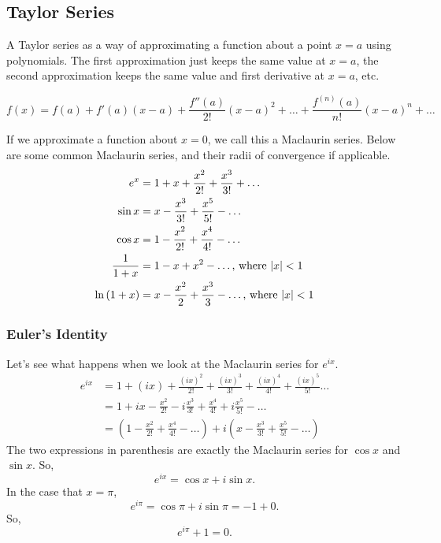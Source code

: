 \subsection{Taylor Series}
\noindent
A Taylor series as a way of approximating a function about a point $x=a$ using polynomials.
The first approximation just keeps the same value at $x=a$, the second approximation keeps the same value and first derivative at $x=a$, etc.
\begin{definition}
	\begin{equation*}
		f(x) = f(a)+f'(a)(x-a) + \frac{f''(a)}{2!}(x-a)^2 + \ldots +  \frac{f^{(n)}(a)}{n!}(x-a)^n + \ldots
	\end{equation*}
\end{definition}

\noindent
If we approximate a function about $x=0$, we call this a Maclaurin series. Below are some common Maclaurin series, and their radii of convergence if applicable.
\begin{align*}
	e^x &= 1 + x + \frac{x^2}{2!} + \frac{x^3}{3!} + \ldots \\
	\sin{x} &= x - \frac{x^3}{3!} + \frac{x^5}{5!} - \ldots \\
	\cos{x} &= 1 - \frac{x^2}{2!} + \frac{x^4}{4!} - \ldots \\
	\frac{1}{1+x} &= 1 - x + x^2 - \ldots \text{, where } \lvert x \rvert < 1 \\
	\ln{(1+x)} &= x - \frac{x^2}{2} + \frac{x^3}{3} - \ldots \text{, where } \lvert x \rvert < 1
\end{align*}

\subsubsection{Euler's Identity}
\noindent
Let's see what happens when we look at the Maclaurin series for $e^{ix}$.
\begin{align*}
	e^{ix} &= 1 + (ix) + \frac{(ix)^2}{2!} + \frac{(ix)^3}{3!} + \frac{(ix)^4}{4!} + \frac{(ix)^5}{5!} \ldots \\
	&= 1 + ix - \frac{x^2}{2!} - i\frac{x^3}{3!} + \frac{x^4}{4!} + i\frac{x^5}{5!} - \ldots \\
	&= \left(1 - \frac{x^2}{2!} + \frac{x^4}{4!} - \ldots \right) + i\left(x - \frac{x^3}{3!} + \frac{x^5}{5!} - \ldots \right)
\end{align*}
The two expressions in parenthesis are exactly the Maclaurin series for $\cos{x}$ and $\sin{x}$. So,
\begin{equation*}
	e^{ix} = \cos{x} + i\sin{x}.
\end{equation*}
In the case that $x = \pi$,
\begin{equation*}
	e^{i\pi} = \cos{\pi} + i\sin{\pi} = -1 + 0.
\end{equation*}
So,
\begin{equation*}
	e^{i\pi} + 1 = 0.
\end{equation*}

